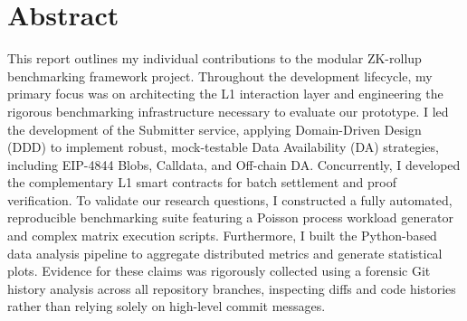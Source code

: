 \documentclass[12pt, a4paper]{uomthesis}
\begin{document}
\chapter*{Abstract}
This report outlines my individual contributions to the modular ZK-rollup benchmarking framework project. Throughout the development lifecycle, my primary focus was on architecting the L1 interaction layer and engineering the rigorous benchmarking infrastructure necessary to evaluate our prototype. I led the development of the Submitter service, applying Domain-Driven Design (DDD) to implement robust, mock-testable Data Availability (DA) strategies, including EIP-4844 Blobs, Calldata, and Off-chain DA. Concurrently, I developed the complementary L1 smart contracts for batch settlement and proof verification. To validate our research questions, I constructed a fully automated, reproducible benchmarking suite featuring a Poisson process workload generator and complex matrix execution scripts. Furthermore, I built the Python-based data analysis pipeline to aggregate distributed metrics and generate statistical plots. Evidence for these claims was rigorously collected using a forensic Git history analysis across all repository branches, inspecting diffs and code histories rather than relying solely on high-level commit messages.
\newpage
\tableofcontents
\newpage
\listoftables

















\appendix

\end{document}
